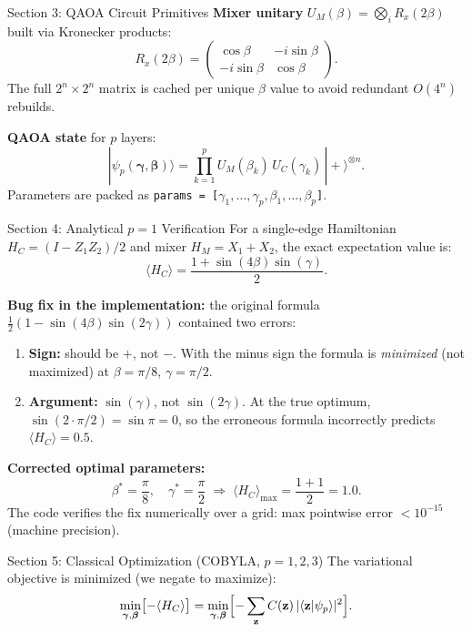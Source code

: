 \documentclass{beamer}
\begin{document}
\begin{frame}
\begin{frame}[fragile]{Section 3: QAOA Circuit Primitives}
\textbf{Mixer unitary} $U_M(\beta) = \bigotimes_i R_x(2\beta)$ built via Kronecker products:
\[
  R_x(2\beta) = \begin{pmatrix}\cos\beta & -i\sin\beta \\ -i\sin\beta & \cos\beta\end{pmatrix}.
\]
The full $2^n \times 2^n$ matrix is cached per unique $\beta$ value to avoid
redundant $O(4^n)$ rebuilds.

\medskip

\textbf{QAOA state} for $p$ layers:
\[
  |\psi_p(\boldsymbol{\gamma},\boldsymbol{\beta})\rangle
  = \prod_{k=1}^{p} U_M(\beta_k)\,U_C(\gamma_k)\,|{+}\rangle^{\otimes n}.
\]
Parameters are packed as \texttt{params = [}$\gamma_1,\ldots,\gamma_p,\beta_1,\ldots,\beta_p$\texttt{]}.
\end{frame}


\begin{frame}{Section 4: Analytical $p=1$ Verification}
For a single-edge Hamiltonian $H_C = (I - Z_1 Z_2)/2$ and
mixer $H_M = X_1 + X_2$, the exact expectation value is:
\[
  \langle H_C\rangle = \frac{1 + \sin(4\beta)\sin(\gamma)}{2}.
\]

\textbf{Bug fix in the implementation:} the original formula
$\frac{1}{2}(1 - \sin(4\beta)\sin(2\gamma))$ contained two errors:
\begin{enumerate}
  \item \textbf{Sign:} should be $+$, not $-$.
        With the minus sign the formula is \emph{minimized} (not maximized)
        at $\beta = \pi/8$, $\gamma = \pi/2$.
  \item \textbf{Argument:} $\sin(\gamma)$, not $\sin(2\gamma)$.
        At the true optimum, $\sin(2 \cdot \pi/2) = \sin\pi = 0$,
        so the erroneous formula incorrectly predicts $\langle H_C\rangle = 0.5$.
\end{enumerate}

\textbf{Corrected optimal parameters:}
\[
  \beta^* = \frac{\pi}{8}, \quad \gamma^* = \frac{\pi}{2}
  \;\Rightarrow\;
  \langle H_C\rangle_{\max} = \frac{1+1}{2} = 1.0.
\]
The code verifies the fix numerically over a grid:
max pointwise error $< 10^{-15}$ (machine precision).
\end{frame}


\begin{frame}{Section 5: Classical Optimization (COBYLA, $p=1,2,3$)}
The variational objective is minimized (we negate to maximize):
\[
  \min_{\boldsymbol{\gamma},\boldsymbol{\beta}} \bigl[-\langle H_C\rangle\bigr]
  = \min_{\boldsymbol{\gamma},\boldsymbol{\beta}}
    \Bigl[-\sum_{\mathbf{z}} C(\mathbf{z})\,|\langle\mathbf{z}|\psi_p\rangle|^2\Bigr].
\]


\end{frame}
\end{frame}
\end{document}
